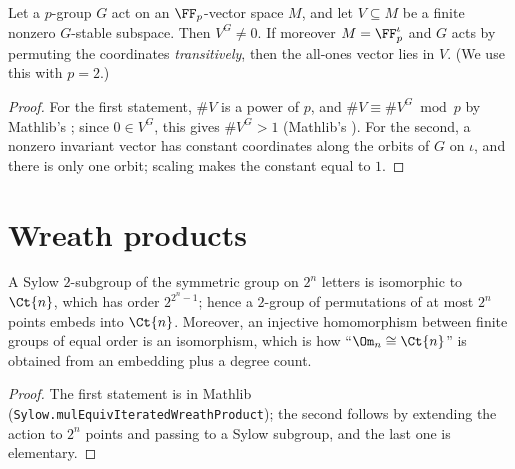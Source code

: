 \begin{lemma}
  \label{lem:invariant}
  \leanok
  Let a $p$-group $G$ act on an $\FF_p$-vector space $M$, and let $V \subseteq M$ be a finite
  nonzero $G$-stable subspace. Then $V^G \ne 0$. If moreover $M = \FF_p^{\iota}$ and $G$ acts by
  permuting the coordinates \emph{transitively}, then the all-ones vector lies in $V$.
  (We use this with $p = 2$.)
\end{lemma}
\begin{proof}
  \leanok
  For the first statement, $\#V$ is a power of $p$, and $\#V \equiv \#V^G \bmod p$ by Mathlib's
  ; since $0 \in V^G$, this gives $\#V^G > 1$
  (Mathlib's ).
  For the second, a nonzero invariant vector has constant coordinates along the orbits of $G$ on
  $\iota$, and there is only one orbit; scaling makes the constant equal to $1$.
\end{proof}

\section{Wreath products}

\begin{lemma}
  \label{lem:sylowwreath}
  \leanok
  A Sylow $2$-subgroup of the symmetric group on $2^n$ letters is isomorphic to $\Ct{n}$, which
  has order $2^{2^n - 1}$; hence a $2$-group of permutations of at most $2^n$ points embeds into
  $\Ct{n}$. Moreover, an injective homomorphism between finite groups of equal order is an
  isomorphism, which is how ``$\Om_n \cong \Ct{n}$'' is obtained from an embedding plus a degree
  count.
\end{lemma}
\begin{proof}
  \leanok
  The first statement is in Mathlib (\texttt{Sylow.mulEquivIteratedWreathProduct}); the second
  follows by extending the action to $2^n$ points and passing to a Sylow subgroup, and the last
  one is elementary.
\end{proof}

